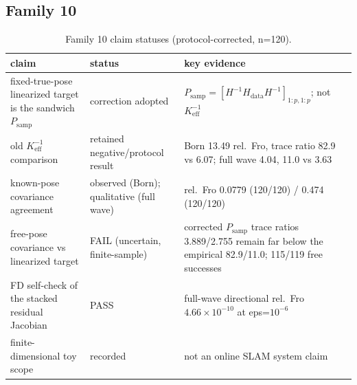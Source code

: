 \documentclass[12pt]{article}
\begin{document}
\subsection{Family 10}
\begin{table}[ht]
\centering
\small
\caption{Family 10 claim statuses (protocol-corrected, n=120).}
\label{app:tab:f10}
\begin{tabular}{p{} p{} p{}}
\toprule
claim & status & key evidence \\
\midrule
fixed-true-pose linearized target is the sandwich $P_{\mathrm{samp}}$ &
correction adopted &
$P_{\mathrm{samp}}=[H^{-1}H_{\mathrm{data}}H^{-1}]_{1:p,1:p}$; not
$K_{\mathrm{eff}}^{-1}$ \\
old $K_{\mathrm{eff}}^{-1}$ comparison & retained negative/protocol result &
Born 13.49 rel.\ Fro, trace ratio 82.9 vs 6.07; full wave 4.04, 11.0 vs 3.63 \\
known-pose covariance agreement & observed (Born); qualitative (full wave) &
rel.\ Fro 0.0779 (120/120) / 0.474 (120/120) \\
free-pose covariance vs linearized target & FAIL (uncertain, finite-sample) &
corrected $P_{\mathrm{samp}}$ trace ratios 3.889/2.755 remain far below the
empirical 82.9/11.0; 115/119 free successes \\
FD self-check of the stacked residual Jacobian & PASS &
full-wave directional rel.\ Fro $4.66\times10^{-10}$ at eps=$10^{-6}$ \\
finite-dimensional toy scope & recorded &
not an online SLAM system claim \\
\bottomrule
\end{tabular}
\end{table}
\end{document}
